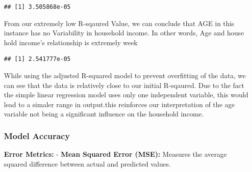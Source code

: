 \documentclass[
]{article}
\newenvironment{Shaded}{\begin{snugshade}}{\end{snugshade}}
\newcommand{\DecValTok}[1]{\textcolor[rgb]{0.00,0.00,0.81}{#1}}
\newcommand{\FunctionTok}[1]{\textcolor[rgb]{0.13,0.29,0.53}{\textbf{#1}}}
\newcommand{\NormalTok}[1]{#1}
\newcommand{\OtherTok}[1]{\textcolor[rgb]{0.56,0.35,0.01}{#1}}
\newcommand{\SpecialCharTok}[1]{\textcolor[rgb]{0.81,0.36,0.00}{\textbf{#1}}}
\begin{document}
\begin{Shaded}
\end{Shaded}

\begin{verbatim}
## [1] 3.505868e-05
\end{verbatim}

From our extremely low R-sqaured Value, we can conclude that AGE in this
instance has no Variability in household income. In other words, Age and
house hold income's relationship is extremely week

\begin{Shaded}
\end{Shaded}

\begin{verbatim}
## [1] 2.541777e-05
\end{verbatim}

While using the adjusted R-squared model to prevent overfitting of the
data, we can see that the data is relatively close to our initial
R-sqaured. Due to the fact the simple linear regression model uses only
one independent variable, this would lead to a simaler range in
output.this reinforces our interpretation of the age variable not being
a significant influence on the household income.

\subsubsection{Model Accuracy}\label{model-accuracy}

\textbf{Error Metrics:} - \textbf{Mean Squared Error (MSE):} Measures
the average squared difference between actual and predicted values.

\begin{Shaded}
\end{Shaded}
\end{document}
